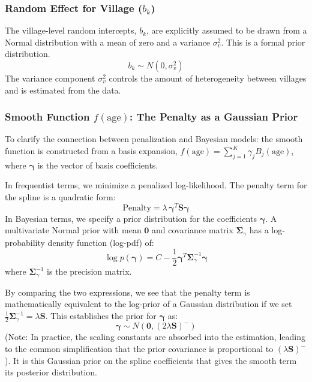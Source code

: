 \documentclass[11pt, a4paper]{article}
\begin{document}
\subsubsection{Random Effect for Village ($b_k$)}
The village-level random intercepts, $b_k$, are explicitly assumed to be drawn from a Normal distribution with a mean of zero and a variance $\sigma^2_v$. This is a formal prior distribution.
\begin{equation*}
    b_k \sim N(0, \sigma^2_v)
\end{equation*}
The variance component $\sigma^2_v$ controls the amount of heterogeneity between villages and is estimated from the data.

\subsubsection{Smooth Function $f(\text{age})$: The Penalty as a Gaussian Prior}
To clarify the connection between penalization and Bayesian models: the smooth function is constructed from a basis expansion, $f(\text{age}) = \sum_{j=1}^{K} \gamma_j B_j(\text{age})$, where $\boldsymbol{\gamma}$ is the vector of basis coefficients.

In frequentist terms, we minimize a penalized log-likelihood. The penalty term for the spline is a quadratic form:
\begin{equation*}
    \text{Penalty} = \lambda \, \boldsymbol{\gamma}^T \mathbf{S} \boldsymbol{\gamma}
\end{equation*}
In Bayesian terms, we specify a prior distribution for the coefficients $\boldsymbol{\gamma}$. A multivariate Normal prior with mean $\mathbf{0}$ and covariance matrix $\mathbf{\Sigma}_{\gamma}$ has a log-probability density function (log-pdf) of:
\begin{equation*}
    \log p(\boldsymbol{\gamma}) = C - \frac{1}{2} \boldsymbol{\gamma}^T \mathbf{\Sigma}_{\gamma}^{-1} \boldsymbol{\gamma}
\end{equation*}
where $\mathbf{\Sigma}_{\gamma}^{-1}$ is the precision matrix.

By comparing the two expressions, we see that the penalty term is mathematically equivalent to the log-prior of a Gaussian distribution if we set $\frac{1}{2} \mathbf{\Sigma}_{\gamma}^{-1} = \lambda \mathbf{S}$. This establishes the prior for $\boldsymbol{\gamma}$ as:
\begin{equation*}
    \boldsymbol{\gamma} \sim N(\mathbf{0}, (2\lambda \mathbf{S})^{-})
\end{equation*}
(Note: In practice, the scaling constants are absorbed into the estimation, leading to the common simplification that the prior covariance is proportional to $(\lambda \mathbf{S})^{-}$). It is this Gaussian prior on the spline coefficients that gives the smooth term its posterior distribution.
\end{document}
